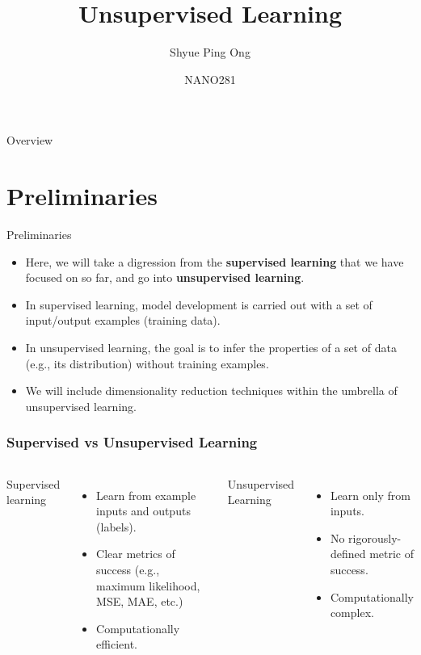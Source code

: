 \documentclass{beamer}
\title[Unsupervised Learning]{Unsupervised Learning}
\author{Shyue Ping Ong}
\institute[UCSD]{University of California, San Diego\\
\medskip
}
\date{NANO281} %
\begin{document}
\begin{frame}
    \titlepage %
\end{frame}


\begin{frame}{Overview}
    \tableofcontents
\end{frame}


\section{Preliminaries}

\begin{frame}{Preliminaries}
    \begin{itemize}
        \item Here, we will take a digression from the \textbf{supervised learning} that we have focused on so far, and go into \textbf{unsupervised learning}.
        \item In supervised learning, model development is carried out with a set of input/output examples (training data). 
        \item In unsupervised learning, the goal is to infer the properties of a set of data (e.g., its distribution) without training examples.
        \item We will include dimensionality reduction techniques within the umbrella of unsupervised learning.
    \end{itemize}
\end{frame}

\begin{frame}
\frametitle{Supervised vs Unsupervised Learning}
\begin{columns}
Supervised learning
\begin{itemize}
    \item Learn from example inputs and outputs (labels).
    \item Clear metrics of success (e.g., maximum likelihood, MSE, MAE, etc.)
    \item Computationally efficient.
\end{itemize}
Unsupervised Learning
\begin{itemize}
    \item Learn only from inputs.
    \item No rigorously-defined metric of success.
    \item Computationally complex.
\end{itemize}

\end{columns}
\end{frame} 
\end{document}
